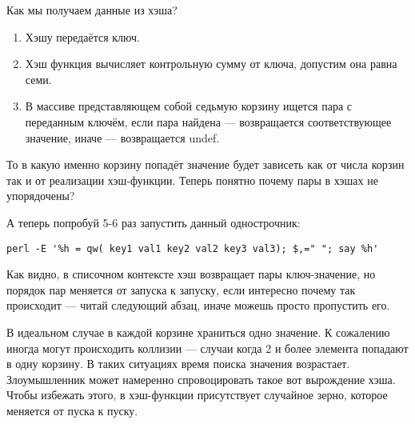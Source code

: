 Как мы получаем данные из хэша?

\begin{enumerate}
\item Хэшу передаётся ключ.
\item Хэш функция вычисляет контрольную сумму от ключа, допустим она равна семи.
\item В массиве представляющем собой седьмую корзину ищется пара с переданным ключём,
  если пара найдена --- возвращается соответствующее значение, иначе --- возвращается undef.
\end{enumerate}

То в какую именно корзину попадёт значение будет зависеть как от числа корзин так и от 
реализации хэш-функции. Теперь понятно почему пары в хэшах не упорядочены?

А теперь попробуй 5-6 раз запустить данный однострочник:
\begin{verbatim}
perl -E '%h = qw( key1 val1 key2 val2 key3 val3); $,=" "; say %h'
\end{verbatim}

Как видно, в списочном контексте хэш возвращает пары ключ-значение, но порядок пар меняется
от запуска к запуску, если интересно почему так происходит --- читай следующий абзац, иначе
можешь просто пропустить его.

В идеальном случае в каждой корзине храниться одно значение. К сожалению иногда могут происходить коллизии --- случаи когда 2 и более элемента попадают в одну корзину. В таких
ситуациях время поиска значения возрастает. Злоумышленник может намеренно
спровоцировать такое вот вырождение хэша. Чтобы избежать этого, в хэш-функции присутствует
случайное зерно, которое меняется от пуска к пуску.

